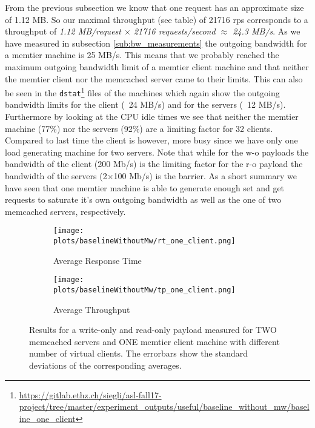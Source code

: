 \documentclass[11pt,a4paper]{article}
\let\ti\textit
\let\tt\texttt
\begin{document}
From the previous subsection we know that one request has an approximate size of 1.12 MB. So our maximal throughput (see table) of 21716 rps corresponds to a throughput of \ti{1.12 MB/request $\times$  21716 requests/second $\approx$ 24.3 MB/s}. As we have measured in subsection \ref{sub:bw_measurements} the outgoing bandwidth for a memtier machine is 25 MB/s. This means that we probably reached the maximum outgoing bandwidth limit of a memtier client machine and that neither the memtier client nor the memcached server came to their limits. This can also be seen in the \tt{dstat}\footnote{\url{https://gitlab.ethz.ch/siegli/asl-fall17-project/tree/master/experiment_outputs/useful/baseline_without_mw/baseline_one_client}} files of the machines which again show the outgoing bandwidth limits for the client (~24 MB/s) and for the servers (~12 MB/s). Furthermore by looking at the CPU idle times we see that neither the memtier machine (77\%) nor the servers (92\%) are a limiting factor for 32 clients. Compared to last time the client is however, more busy since we have only one load generating machine for two servers. Note that while for the w-o payloads the bandwidth of the client (200 Mb/s) is the limiting factor for the r-o payload the bandwidth of the servers (2$\times$100 Mb/s) is the barrier. As a short summary we have seen that one memtier machine is able to generate enough set and get requests to saturate it's own outgoing bandwidth as well as the one of two memcached servers, respectively.

\begin{figure}
\centering
\begin{subfigure}{.5\textwidth}
    \centering
    \texttt{[image: plots/baselineWithoutMw/rt\_one\_client.png]}
    \caption{Average Response Time }
    \label{plt:bl:rt_one_client}
\end{subfigure}%
\begin{subfigure}{.5\textwidth}
    \centering
    \texttt{[image: plots/baselineWithoutMw/tp\_one\_client.png]}
    \caption{Average Throughput}
    \label{plt:bl:tp_one_client}

\end{subfigure}
\caption{Results for a write-only and read-only payload measured for TWO memcached servers and ONE memtier client machine with different number of virtual clients. The errorbars show the standard deviations of the corresponding averages.}
\label{plt:bl:one_client}
\end{figure}
\end{document}
